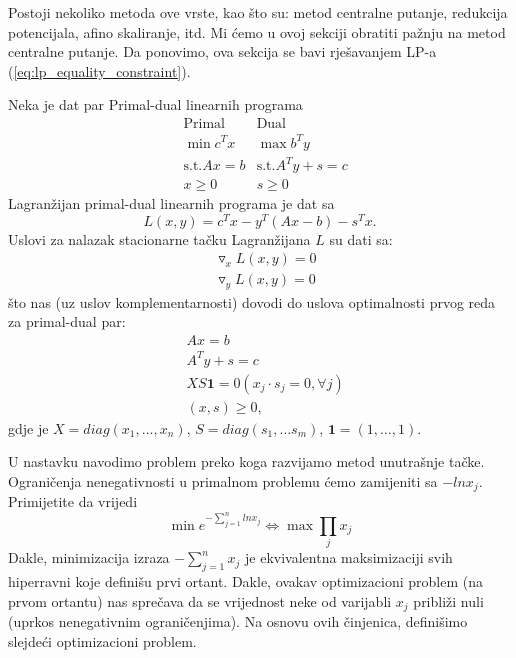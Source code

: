 \documentclass[a4paper, utf8, 11pt, colorlinks]{article}
\begin{document}
Postoji nekoliko metoda ove vrste, kao što su: metod centralne putanje, redukcija potencijala, afino skaliranje, itd. Mi ćemo u ovoj sekciji obratiti pažnju na metod centralne putanje. Da ponovimo, ova sekcija se bavi rješavanjem LP-a (\ref{eq:lp_equality_constraint}). 

Neka je dat par Primal-dual linearnih programa \\

$$ \begin{array}{lcc}
	&\mbox{Primal}            & \mbox{Dual}     \\
	&\min  c^T x       & \max  b^T y \\
	& \mbox{s.t.} Ax = b &   \mbox{s.t.} A^Ty + s = c \\
	& x \geq 0   &   s \geq 0
\end{array}
$$
Lagranžijan primal-dual linearnih programa je dat sa 
\begin{equation}
	L(x,y) = c^Tx - y^T(Ax - b) - s^T x.
\end{equation}
Uslovi za nalazak stacionarne tačku Lagranžijana $L$ su dati sa:
\begin{align}
	&\triangledown_x L(x,y) = 0\\
	&\triangledown_y L(x,y) = 0
\end{align} 
što nas (uz uslov komplementarnosti) dovodi do uslova optimalnosti prvog reda za primal-dual par:
\begin{align}
	&Ax = b \\
	&A^T y + s = c \\
	&XS\mathbf{1} = 0 (x_j \cdot s_j =0 , \forall j) \\
	&  (x, s ) \geq 0,
\end{align}
gdje je $X = diag (x_1, \ldots, x_n)$, $S= diag(s_1,\ldots s_m)$, $\mathbf{1}=(1,\ldots, 1)$.

U nastavku navodimo problem preko koga razvijamo metod unutrašnje tačke. Ograničenja nenegativnosti u primalnom problemu ćemo zamijeniti sa $-ln x_j$. 
Primijetite da vrijedi 
$$\min e^{-\sum_{j=1}^n ln x_j} \Leftrightarrow \max \prod_{j} x_j $$
Dakle, minimizacija izraza $-\sum_{j=1}^n x_j$ je ekvivalentna maksimizaciji svih hiperravni koje definišu prvi ortant. Dakle, ovakav optimizacioni problem (na prvom ortantu) nas sprečava da se vrijednost neke od varijabli $x_j$ približi nuli (uprkos nenegativnim ograničenjima).  Na osnovu ovih činjenica, definišimo slejdeći optimizacioni problem. 
\end{document}
